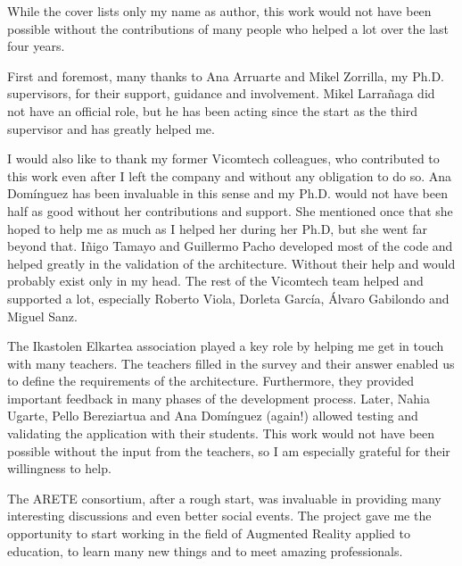 


\begin{acknowledgementslong} 

While the cover lists only my name as author, this work would not have been possible without the contributions of many people who helped a lot over the last four years.

First and foremost, many thanks to Ana Arruarte and Mikel Zorrilla, my Ph.D. supervisors, for their support, guidance and involvement. Mikel Larrañaga did not have an official role, but he has been acting since the start as the third supervisor and has greatly helped me.

I would also like to thank my former Vicomtech colleagues, who contributed to this work even after I left the company and without any obligation to do so. Ana Domínguez has been invaluable in this sense and my Ph.D. would not have been half as good without her contributions and support. She mentioned once that she hoped to help me as much as I helped her during her Ph.D, but she went far beyond that. Iñigo Tamayo and Guillermo Pacho developed most of the code and helped greatly in the validation of the architecture. Without their help \arch{} and \appname{} would probably exist only in my head. The rest of the Vicomtech team helped and supported a lot, especially Roberto Viola, Dorleta García, Álvaro Gabilondo and Miguel Sanz. 

The Ikastolen Elkartea association played a key role by helping me get in touch with many teachers. The teachers filled in the survey and their answer enabled us to define the requirements of the architecture. Furthermore, they provided important feedback in many phases of the development process. Later, Nahia Ugarte, Pello Bereziartua and Ana Domínguez (again!) allowed testing and validating the application with their students. This work would not have been possible without the input from the teachers, so I am especially grateful for their willingness to help.

The ARETE consortium, after a rough start, was invaluable in providing many interesting discussions and even better social events. The project gave me the opportunity to start working in the field of Augmented Reality applied to education, to learn many new things and to meet amazing professionals.


\end{acknowledgementslong}
